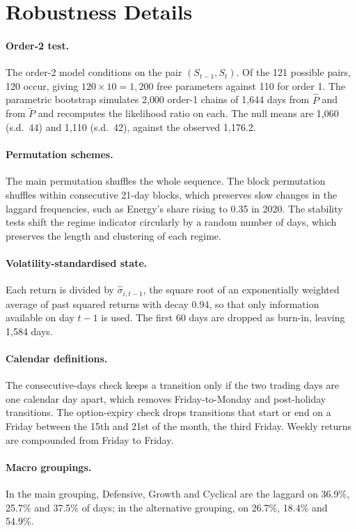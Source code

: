 \documentclass[11pt]{article}
\begin{document}
\clearpage
\section{Robustness Details}
\label{app:robust}

\paragraph{Order-2 test.} The order-2 model conditions on the pair $(S_{t-1}, S_t)$. Of the 121 possible pairs, 120 occur, giving $120 \times 10 = 1{,}200$ free parameters against 110 for order 1. The parametric bootstrap simulates 2{,}000 order-1 chains of 1{,}644 days from $\hat P$ and from $\tilde P$ and recomputes the likelihood ratio on each. The null means are 1{,}060 (s.d.\ 44) and 1{,}110 (s.d.\ 42), against the observed 1{,}176.2.

\paragraph{Permutation schemes.} The main permutation shuffles the whole sequence. The block permutation shuffles within consecutive 21-day blocks, which preserves slow changes in the laggard frequencies, such as Energy's share rising to 0.35 in 2020. The stability tests shift the regime indicator circularly by a random number of days, which preserves the length and clustering of each regime.

\paragraph{Volatility-standardised state.} Each return is divided by $\hat\sigma_{i,t-1}$, the square root of an exponentially weighted average of past squared returns with decay 0.94, so that only information available on day $t-1$ is used. The first 60 days are dropped as burn-in, leaving 1{,}584 days.

\paragraph{Calendar definitions.} The consecutive-days check keeps a transition only if the two trading days are one calendar day apart, which removes Friday-to-Monday and post-holiday transitions. The option-expiry check drops transitions that start or end on a Friday between the 15th and 21st of the month, the third Friday. Weekly returns are compounded from Friday to Friday.

\paragraph{Macro groupings.} In the main grouping, Defensive, Growth and Cyclical are the laggard on 36.9\%, 25.7\% and 37.5\% of days; in the alternative grouping, on 26.7\%, 18.4\% and 54.9\%.
\end{document}
